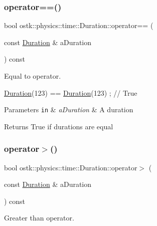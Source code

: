 \subsubsection{\texorpdfstring{operator==()}{operator==()}}
{\footnotesize\ttfamily bool ostk\+::physics\+::time\+::\+Duration\+::operator== (\begin{DoxyParamCaption}\item[{const \hyperlink{classostk_1_1physics_1_1time_1_1_duration}{Duration} \&}]{a\+Duration }\end{DoxyParamCaption}) const}



Equal to operator. 


\begin{DoxyCode}
\hyperlink{classostk_1_1physics_1_1time_1_1_duration_a6ba3a020742ca6e3bf0b1970dd039c07}{Duration}(123) == \hyperlink{classostk_1_1physics_1_1time_1_1_duration_a6ba3a020742ca6e3bf0b1970dd039c07}{Duration}(123) ; \textcolor{comment}{// True}
\end{DoxyCode}



\begin{DoxyParams}[1]{Parameters}
\mbox{\tt in}  & {\em a\+Duration} & A duration \\
\hline
\end{DoxyParams}
\begin{DoxyReturn}{Returns}
True if durations are equal 
\end{DoxyReturn}
\mbox{\label{classostk_1_1physics_1_1time_1_1_duration_a9daebcdc2a5ab12306630d85e44dcb7a}} 
\subsubsection{\texorpdfstring{operator$>$()}{operator>()}}
{\footnotesize\ttfamily bool ostk\+::physics\+::time\+::\+Duration\+::operator$>$ (\begin{DoxyParamCaption}\item[{const \hyperlink{classostk_1_1physics_1_1time_1_1_duration}{Duration} \&}]{a\+Duration }\end{DoxyParamCaption}) const}



Greater than operator. 


